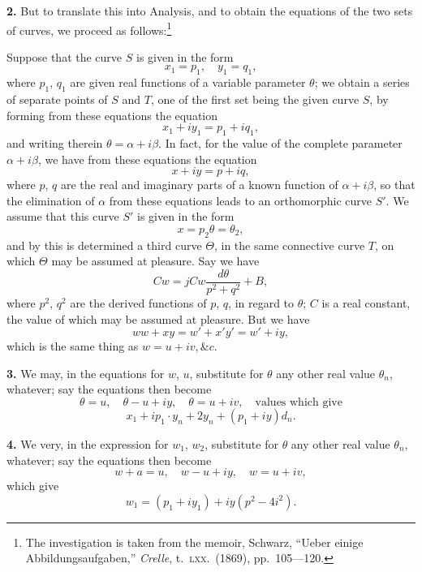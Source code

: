 \documentclass[11pt,a4paper]{article}
\begin{document}
\textbf{2.} But to translate this into Analysis, and to obtain the equations of the two sets of curves, we proceed as follows:\footnote{The investigation is taken from the memoir, Schwarz, ``Ueber einige Abbildungsaufgaben,'' \textit{Crelle}, t.\ \textsc{lxx}.\ (1869), pp.\ 105---120.}

Suppose that the curve $S$ is given in the form
\[
x_1 = p_1, \quad y_1 = q_1,
\]
where $p_1$, $q_1$ are given real functions of a variable parameter $\theta$; we obtain a series of separate points of $S$ and $T$, one of the first set being the given curve $S$, by forming from these equations the equation
\[
x_1 + iy_1 = p_1 + iq_1,
\]
and writing therein $\theta = \alpha + i\beta$. In fact, for the value of the complete parameter $\alpha + i\beta$, we have from these equations the equation
\[
x + iy = p + iq,
\]
where $p$, $q$ are the real and imaginary parts of a known function of $\alpha + i\beta$, so that the elimination of $\alpha$ from these equations leads to an orthomorphic curve $S'$. We assume that this curve $S'$ is given in the form
\[
x = p_2 \theta = \theta_2,
\]
and by this is determined a third curve $\Theta$, in the same connective curve $T$, on which $\Theta$ may be assumed at pleasure. Say we have
\[
Cw = j Cw \frac{d\theta}{p^2 + q^2} + B,
\]
where $p^2$, $q^2$ are the derived functions of $p$, $q$, in regard to $\theta$; $C$ is a real constant, the value of which may be assumed at pleasure. But we have
\[
ww + xy = w' + x'y' = w' + iy,
\]
which is the same thing as $w = u + iv$,\,$\&c.$

\textbf{3.} We may, in the equations for $w$, $u$, substitute for $\theta$ any other real value $\theta_n$, whatever; say the equations then become
\[
\theta = u, \quad \theta - u + iy, \quad \theta = u + iv, \quad \text{values which give}
\]
\[
x_1 + ip_1 \cdot y_n + 2y_n + (p_1 + iy)d_n.
\]

\textbf{4.} We very, in the expression for $w_1$, $w_2$, substitute for $\theta$ any other real value $\theta_n$, whatever; say the equations then become
\[
w + a = u, \quad w - u + iy, \quad w = u + iv,
\]
which give
\[
w_1 = (p_1 + iy_1) + iy(p^2 - 4i^2).
\]
\end{document}
